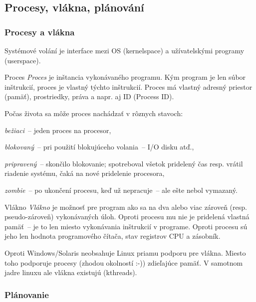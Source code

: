 \subsection{Procesy, vlákna, plánování}

\subsubsection*{Procesy a vlákna}
Systémové volání je interface mezi OS (kernelspace) a užívatelskými programy (userspace).

\begin{definiceN}{Proces}
  \emph{Proces} je inštancia vykonávaného programu. Kým program je len súbor
  inštrukcií, proces je vlastný  týchto inštrukcií. Proces má vlastný
  adresný priestor (pamäť), prostriedky, práva a napr. aj ID (Process ID).
\end{definiceN}

Počas života sa môže proces nachádzať v rôznych stavoch:
\begin{pitemize}
  \item \emph{bežiaci}~-- jeden proces na procesor,
  \item \emph{blokovaný}~-- pri použití blokujúceho volania~-- I/O disku atď.,
  \item \emph{pripravený}~-- skončilo blokovanie; spotreboval všetok pridelený čas resp. vrátil riadenie systému, čaká na nové pridelenie procesora,
  \item \emph{zombie}~-- po ukončení procesu, keď už nepracuje~-- ale ešte nebol vymazaný.
\end{pitemize}

\begin{definiceN}{Vlákno}
  \emph{Vlákno} je možnosť pre program ako sa  na dva alebo viac
  zároveň (resp. pseudo-zároveň) vykonávaných úloh. Oproti procesu mu nie je
  pridelená vlastná pamäť~-- je to len miesto vykonávania inštrukcií v programe.
  Oproti procesu sú jeho  len hodnota programového čítača, stav
  registrov CPU a zásobník.
\end{definiceN}

Oproti Windows/Solaris neobsahuje Linux priamu podporu pre vlákna. Miesto toho podporuje procesy (zhodou okolností :-)) zdieľajúce pamäť. V samotnom jadre linuxu ale vlákna existujú (kthreads).

\subsubsection*{Plánovanie}

